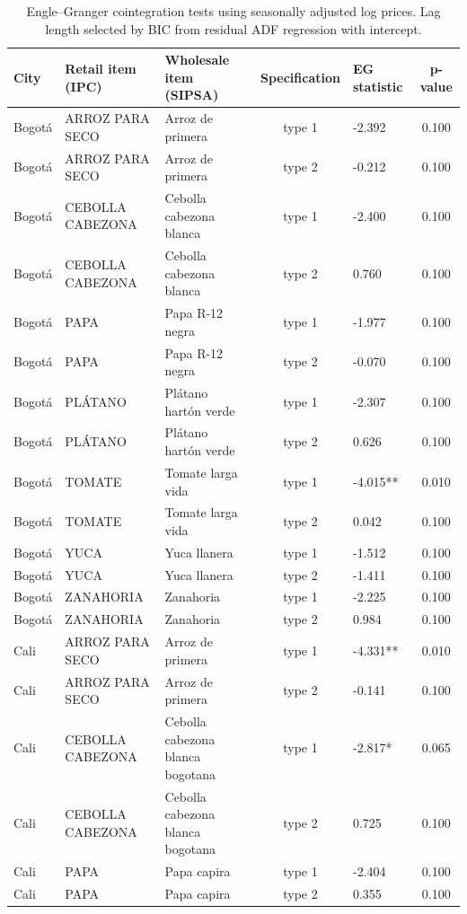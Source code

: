 \documentclass[
  12pt,
]{article}
\begin{document}
\begin{longtable}[t]{lllclc}
\caption{\label{tab:coint-eg-q1-tables}Engle–Granger cointegration tests using seasonally adjusted log prices. Lag length selected by BIC from residual ADF regression with intercept.}\\
\toprule
City & Retail item (IPC) & Wholesale item (SIPSA) & Specification & EG statistic & p-value\\
\midrule
Bogotá & ARROZ PARA SECO & Arroz de primera & type 1 & -2.392 & 0.100\\
Bogotá & ARROZ PARA SECO & Arroz de primera & type 2 & -0.212 & 0.100\\
Bogotá & CEBOLLA CABEZONA & Cebolla cabezona blanca & type 1 & -2.400 & 0.100\\
Bogotá & CEBOLLA CABEZONA & Cebolla cabezona blanca & type 2 & 0.760 & 0.100\\
Bogotá & PAPA & Papa R-12 negra & type 1 & -1.977 & 0.100\\
\addlinespace
Bogotá & PAPA & Papa R-12 negra & type 2 & -0.070 & 0.100\\
Bogotá & PLÁTANO & Plátano hartón verde & type 1 & -2.307 & 0.100\\
Bogotá & PLÁTANO & Plátano hartón verde & type 2 & 0.626 & 0.100\\
Bogotá & TOMATE & Tomate larga vida & type 1 & -4.015** & 0.010\\
Bogotá & TOMATE & Tomate larga vida & type 2 & 0.042 & 0.100\\
\addlinespace
Bogotá & YUCA & Yuca llanera & type 1 & -1.512 & 0.100\\
Bogotá & YUCA & Yuca llanera & type 2 & -1.411 & 0.100\\
Bogotá & ZANAHORIA & Zanahoria & type 1 & -2.225 & 0.100\\
Bogotá & ZANAHORIA & Zanahoria & type 2 & 0.984 & 0.100\\
Cali & ARROZ PARA SECO & Arroz de primera & type 1 & -4.331** & 0.010\\
\addlinespace
Cali & ARROZ PARA SECO & Arroz de primera & type 2 & -0.141 & 0.100\\
Cali & CEBOLLA CABEZONA & Cebolla cabezona blanca bogotana & type 1 & -2.817* & 0.065\\
Cali & CEBOLLA CABEZONA & Cebolla cabezona blanca bogotana & type 2 & 0.725 & 0.100\\
Cali & PAPA & Papa capira & type 1 & -2.404 & 0.100\\
Cali & PAPA & Papa capira & type 2 & 0.355 & 0.100\\

\end{longtable}
\end{document}
